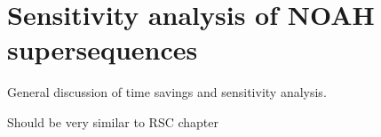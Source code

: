 \section{Sensitivity analysis of NOAH supersequences}
\label{sec:noah__snr}

General discussion of time savings and sensitivity analysis.

Should be very similar to RSC chapter
